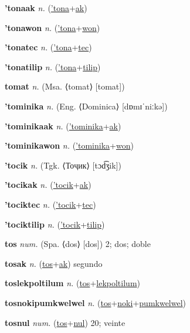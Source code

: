 \textbf{\hypertarget{'tonaak}{'tonaak}} \textit{n.} (\hyperlink{'tona}{'tona}+\allowbreak \hyperlink{ak}{ak})


\textbf{\hypertarget{'tonawon}{'tonawon}} \textit{n.} (\hyperlink{'tona}{'tona}+\allowbreak \hyperlink{won}{won})


\textbf{\hypertarget{'tonatec}{'tonatec}} \textit{n.} (\hyperlink{'tona}{'tona}+\allowbreak \hyperlink{tec}{tec})


\textbf{\hypertarget{'tonatilip}{'tonatilip}} \textit{n.} (\hyperlink{'tona}{'tona}+\allowbreak \hyperlink{tilip}{tilip})


\textbf{\hypertarget{tomat}{tomat}} \textit{n.} (Msa. ⟨tomat⟩ [tomat])


\textbf{\hypertarget{'tominika}{'tominika}} \textit{n.} (Eng. ⟨Dominica⟩ [dɒmɪˈniːkə])


\textbf{\hypertarget{'tominikaak}{'tominikaak}} \textit{n.} (\hyperlink{'tominika}{'tominika}+\allowbreak \hyperlink{ak}{ak})


\textbf{\hypertarget{'tominikawon}{'tominikawon}} \textit{n.} (\hyperlink{'tominika}{'tominika}+\allowbreak \hyperlink{won}{won})


\textbf{\hypertarget{'tocik}{'tocik}} \textit{n.} (Tgk. ⟨Тоҷик⟩ [tɔd͡ʒik])


\textbf{\hypertarget{'tocikak}{'tocikak}} \textit{n.} (\hyperlink{'tocik}{'tocik}+\allowbreak \hyperlink{ak}{ak})


\textbf{\hypertarget{'tociktec}{'tociktec}} \textit{n.} (\hyperlink{'tocik}{'tocik}+\allowbreak \hyperlink{tec}{tec})


\textbf{\hypertarget{'tociktilip}{'tociktilip}} \textit{n.} (\hyperlink{'tocik}{'tocik}+\allowbreak \hyperlink{tilip}{tilip})


\textbf{\hypertarget{tos}{tos}} \textit{num.} (Spa. ⟨dos⟩ [dos])
2; dos; doble

\textbf{\hypertarget{tosak}{tosak}} \textit{n.} (\hyperlink{tos}{tos}+\allowbreak \hyperlink{ak}{ak})
segundo

\textbf{\hypertarget{toslekpoltilum}{toslekpoltilum}} \textit{n.} (\hyperlink{tos}{tos}+\allowbreak \hyperlink{lekpoltilum}{lekpoltilum})


\textbf{\hypertarget{tosnokipumkwelwel}{tosnokipumkwelwel}} \textit{n.} (\hyperlink{tos}{tos}+\allowbreak \hyperlink{noki}{noki}+\allowbreak \hyperlink{pumkwelwel}{pumkwelwel})


\textbf{\hypertarget{tosnul}{tosnul}} \textit{num.} (\hyperlink{tos}{tos}+\allowbreak \hyperlink{nul}{nul})
20; veinte

